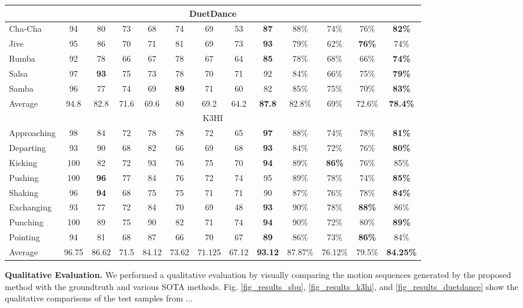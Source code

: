 \begin{table}
\begin{tabular*}{1.0\textwidth}{@{\extracolsep{\fill}}l|cccccccc|cccc}
			\multicolumn{13}{c}{DuetDance} \\ 
			\midrule
			
			
			
			
			Cha-Cha &94&80&73&68&74&69&53&\textbf{87}&88\%&74\%&76\%&\textbf{82\%}\\
			Jive &95&86&70&71&81&69&73&\textbf{93}&79\%&62\%&\textbf{76\%}&74\%\\
			Rumba &92&78&66&67&78&67&64&\textbf{85}&78\%&68\%&66\%&\textbf{74\%}\\
			Salsa &97&\textbf{93}&75&73&78&70&71&92&84\%&66\%&75\%&\textbf{79\%}\\
			Samba &96&77&74&69&\textbf{89}&71&60&82&85\%&75\%&70\%&\textbf{83\%}\\
			Average &94.8&82.8&71.6&69.6&80&69.2&64.2&\textbf{87.8}&82.8\%&69\%&72.6\%&\textbf{78.4\%}\\ 
			\midrule
			
			\multicolumn{13}{c}{K3HI} \\ 
			\midrule
			
			
			Approaching &98&84&72&78&78&72&65&\textbf{97}&88\%&74\%&78\%&\textbf{81\%}\\
			Departing &93&90&68&82&66&69&68&\textbf{93}&84\%&72\%&76\%&\textbf{80\%}\\
			Kicking &100&82&72&93&76&75&70&\textbf{94}&89\%&\textbf{86\%}&76\%&85\%\\
			Pushing &100&\textbf{96}&77&84&76&72&74&95&89\%&78\%&74\%&\textbf{85\%}\\
			Shaking &96&\textbf{94}&68&75&75&71&71&90&87\%&76\%&78\%&\textbf{84\%}\\
			Exchanging &93&77&72&84&70&69&48&\textbf{93}&90\%&78\%&\textbf{88\%}&86\%\\
			Punching &100&89&75&90&82&71&74&\textbf{94}&90\%&72\%&80\%&\textbf{89\%}\\
			Pointing &94&81&68&87&66&70&67&\textbf{89}&86\%&73\%&\textbf{86\%}&84\%\\
			Average &96.75&86.62&71.5&84.12&73.62&71.125&67.12&\textbf{93.12}&87.87\%&76.12\%&79.5\%&\textbf{84.25\%}\\ 
			\midrule
			
	\end{tabular*}
\end{table}


\noindent
\textbf{Qualitative Evaluation.} We performed a qualitative evaluation by visually comparing the motion sequences generated by the proposed method with the groundtruth and various SOTA methods. Fig. \ref{fig_results_sbu}, \ref{fig_results_k3hi}, and \ref{fig_results_duetdance} show the qualitative comparisons of the test samples from ...


